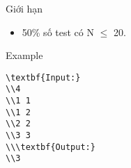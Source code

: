 Giới hạn  
\begin{itemize}
	\item     50\% số test có N  $\le$  20.   
\end{itemize}
   Example  
\begin{verbatim}
\textbf{Input:}
\\4
\\1 1
\\1 2
\\2 2
\\3 3
\\\textbf{Output:}
\\3\end{verbatim}